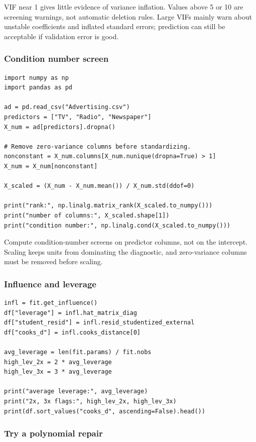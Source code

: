 VIF near 1 gives little evidence of variance inflation.  Values above 5 or 10 are screening warnings, not automatic deletion rules.  Large VIFs mainly warn about unstable coefficients and inflated standard errors; prediction can still be acceptable if validation error is good.

\subsubsection*{Condition number screen}

\begin{verbatim}
import numpy as np
import pandas as pd

ad = pd.read_csv("Advertising.csv")
predictors = ["TV", "Radio", "Newspaper"]
X_num = ad[predictors].dropna()

# Remove zero-variance columns before standardizing.
nonconstant = X_num.columns[X_num.nunique(dropna=True) > 1]
X_num = X_num[nonconstant]

X_scaled = (X_num - X_num.mean()) / X_num.std(ddof=0)

print("rank:", np.linalg.matrix_rank(X_scaled.to_numpy()))
print("number of columns:", X_scaled.shape[1])
print("condition number:", np.linalg.cond(X_scaled.to_numpy()))
\end{verbatim}

Compute condition-number screens on predictor columns, not on the intercept.  Scaling keeps units from dominating the diagnostic, and zero-variance columns must be removed before scaling.

\subsubsection*{Influence and leverage}

\begin{verbatim}
infl = fit.get_influence()
df["leverage"] = infl.hat_matrix_diag
df["student_resid"] = infl.resid_studentized_external
df["cooks_d"] = infl.cooks_distance[0]

avg_leverage = len(fit.params) / fit.nobs
high_lev_2x = 2 * avg_leverage
high_lev_3x = 3 * avg_leverage

print("average leverage:", avg_leverage)
print("2x, 3x flags:", high_lev_2x, high_lev_3x)
print(df.sort_values("cooks_d", ascending=False).head())
\end{verbatim}

\subsubsection*{Try a polynomial repair}

